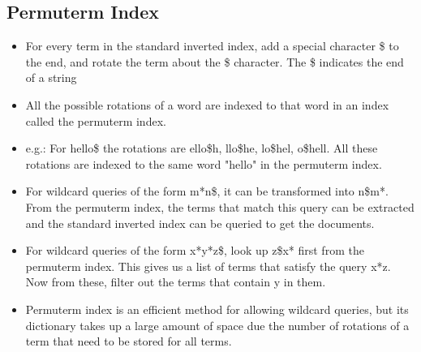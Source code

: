 \documentclass{article}
\begin{document}
\subsection{Permuterm Index}
\begin{itemize}
    \item For every term in the standard inverted index, add a special character \$ to the end, and rotate the term about the \$ character. The \$ indicates the end of a string
    
    \item All the possible rotations of a word are indexed to that word in an index called the permuterm index. 
        
    \item e.g.: For hello\$ the rotations are ello\$h, llo\$he, lo\$hel, o\$hell. All these rotations are indexed to the same word "hello" in the permuterm index. 
    
    \item For wildcard queries of the form m*n\$, it can be transformed into n\$m*. From the permuterm index, the terms that match this query can be extracted and the standard inverted index can be queried to get the documents.
    
    \item For wildcard queries of the form x*y*z\$, look up z\$x* first from the permuterm index. This gives us a list of terms that satisfy the query x*z. Now from these, filter out the terms that contain y in them. 
    
    \item Permuterm index is an efficient method for allowing wildcard queries, but its dictionary takes up a large amount of space due the number of rotations of a term that need to be stored for all terms. 
\end{itemize}
\end{document}
